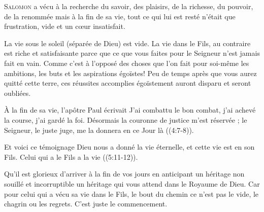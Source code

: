 
\lettrine{S}{alomon} a vécu à la recherche du savoir, des plaisirs,
 de la richesse, du pouvoir, de la renommée
 \ocadr mais à la fin de sa vie, tout ce qui lui est resté
 n'était que frustration, vide et un c\oe{}ur insatisfait. 

La vie sous le soleil (séparée de Dieu) est vide.
 La vie dans le Fils, au contraire est riche et satisfaisante
 parce que ce que vous faites pour le Seigneur n'est jamais fait en vain.
 Comme c'est à l'opposé des choses que l'on fait pour soi-même
 \ocadr les ambitions, les buts et les aspirations égoïstes!
 Peu de temps après que vous aurez quitté cette terre,
 ces réussites accomplies égoïstement auront disparu et seront oubliées. 


À la fin de sa vie, l'apôtre Paul écrivait\frcolon{} 
 \Og J'ai combattu le bon combat, j'ai achevé la course, j'ai gardé la foi.
 Désormais la couronne de justice m'est réservée ;
 le Seigneur, le juste juge, me la donnera en ce Jour là \Fg{}
 ((4:7-8)). 

Et voici ce témoignage\frcolon{}
 \Og Dieu nous a donné la vie éternelle, et cette vie est en son Fils.
 Celui qui a le Fils a la vie \Fg{} ((5:11-12)). 

Qu'il est glorieux d'arriver à la fin de vos jours en anticipant un héritage
 non souillé et incorruptible \ocadr un héritage qui vous attend
 dans le Royaume de Dieu.
 Car pour celui qui a vécu sa vie dans le Fils, le bout du chemin
 ce n'est pas le vide, le chagrin ou les regrets. C'est juste le commencement. 

\dvrule






